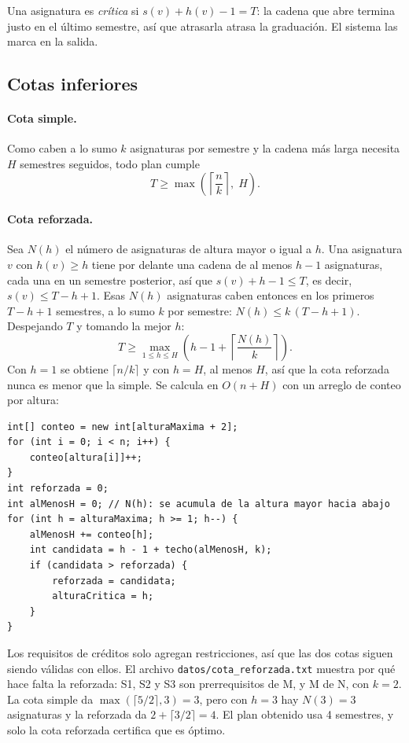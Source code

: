 \documentclass[11pt,letterpaper]{article}
\begin{document}
Una asignatura es \emph{crítica} si $s(v) + h(v) - 1 = T$: la cadena que abre termina justo en el último semestre, así que atrasarla atrasa la graduación. El sistema las marca en la salida.

\subsection{Cotas inferiores}\label{sec:cotas}
\paragraph{Cota simple.} Como caben a lo sumo $k$ asignaturas por semestre y la cadena más larga necesita $H$ semestres seguidos, todo plan cumple
\[
T \geq \max\left(\left\lceil \frac{n}{k} \right\rceil,\; H\right).
\]

\paragraph{Cota reforzada.} Sea $N(h)$ el número de asignaturas de altura mayor o igual a $h$. Una asignatura $v$ con $h(v) \geq h$ tiene por delante una cadena de al menos $h - 1$ asignaturas, cada una en un semestre posterior, así que $s(v) + h - 1 \leq T$, es decir, $s(v) \leq T - h + 1$. Esas $N(h)$ asignaturas caben entonces en los primeros $T - h + 1$ semestres, a lo sumo $k$ por semestre: $N(h) \leq k\,(T - h + 1)$. Despejando $T$ y tomando la mejor $h$:
\[
T \geq \max_{1 \leq h \leq H} \left( h - 1 + \left\lceil \frac{N(h)}{k} \right\rceil \right).
\]
Con $h = 1$ se obtiene $\lceil n/k \rceil$ y con $h = H$, al menos $H$, así que la cota reforzada nunca es menor que la simple. Se calcula en $O(n + H)$ con un arreglo de conteo por altura:
\begin{lstlisting}[style=java]
int[] conteo = new int[alturaMaxima + 2];
for (int i = 0; i < n; i++) {
    conteo[altura[i]]++;
}
int reforzada = 0;
int alMenosH = 0; // N(h): se acumula de la altura mayor hacia abajo
for (int h = alturaMaxima; h >= 1; h--) {
    alMenosH += conteo[h];
    int candidata = h - 1 + techo(alMenosH, k);
    if (candidata > reforzada) {
        reforzada = candidata;
        alturaCritica = h;
    }
}
\end{lstlisting}

Los requisitos de créditos solo agregan restricciones, así que las dos cotas siguen siendo válidas con ellos. El archivo \texttt{datos/cota\_reforzada.txt} muestra por qué hace falta la reforzada: S1, S2 y S3 son prerrequisitos de M, y M de N, con $k = 2$. La cota simple da $\max(\lceil 5/2 \rceil, 3) = 3$, pero con $h = 3$ hay $N(3) = 3$ asignaturas y la reforzada da $2 + \lceil 3/2 \rceil = 4$. El plan obtenido usa 4 semestres, y solo la cota reforzada certifica que es óptimo.
\end{document}
